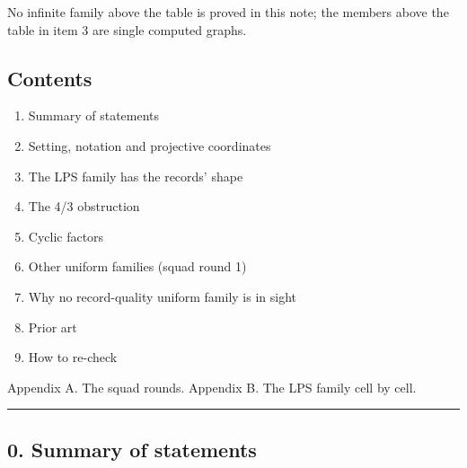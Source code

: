 \documentclass[
  10pt,
]{article}
\providecommand{\tightlist}{%
  \setlength{\itemsep}{0pt}\setlength{\parskip}{0pt}}
\begin{document}
No infinite family above the table is proved in this note; the members
above the table in item 3 are single computed graphs.

\hypertarget{contents}{%
\subsection{Contents}\label{contents}}

\begin{enumerate}
\def\labelenumi{\arabic{enumi}.}
\setcounter{enumi}{-1}
\tightlist
\item
  Summary of statements
\item
  Setting, notation and projective coordinates
\item
  The LPS family has the records' shape
\item
  The 4/3 obstruction
\item
  Cyclic factors
\item
  Other uniform families (squad round 1)
\item
  Why no record-quality uniform family is in sight
\item
  Prior art
\item
  How to re-check
\end{enumerate}

Appendix A. The squad rounds. Appendix B. The LPS family cell by cell.

\begin{center}\rule{0.5\linewidth}{0.5pt}\end{center}

\hypertarget{summary-of-statements}{%
\subsection{0. Summary of statements}\label{summary-of-statements}}
\end{document}
